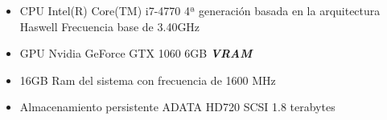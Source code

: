 \begin{itemize}
    \item CPU Intel(R) Core(TM) i7-4770 4ª generación basada en la arquitectura Haswell Frecuencia base de 3.40GHz
    \item GPU Nvidia GeForce GTX 1060 6GB \textbf{\textit{VRAM}}
    \item 16GB Ram del sistema con frecuencia de 1600 MHz
    \item Almacenamiento persistente ADATA HD720 SCSI 1.8 terabytes
\end{itemize}



